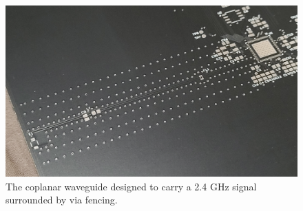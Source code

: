 \begin{figure}
    \centering
    \label{fig:mcu_v1_cpwg}
    \includegraphics[width=\linewidth]{images/mcu_v1_cpwg.jpg}
    \caption{The coplanar waveguide designed to carry a 2.4 GHz signal surrounded by via fencing.}
\end{figure}